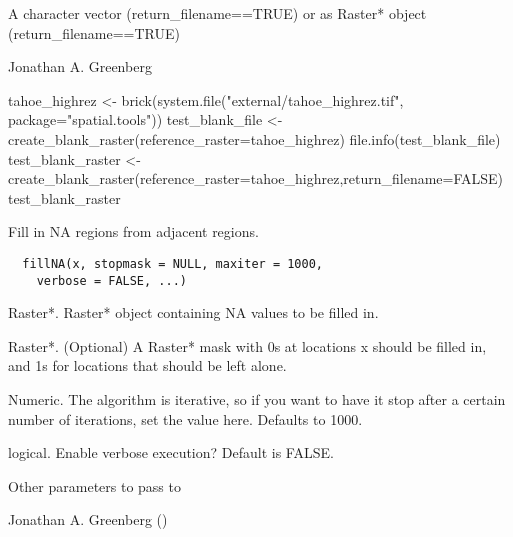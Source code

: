 \documentclass[a4paper]{book}
\begin{document}
%
\begin{Value}
A character vector (return\_filename==TRUE) or as Raster*
object (return\_filename==TRUE)
\end{Value}
%
\begin{Author}\relax
Jonathan A. Greenberg
\end{Author}
%
\begin{Examples}
\begin{ExampleCode}
tahoe_highrez <- brick(system.file("external/tahoe_highrez.tif", package="spatial.tools"))
test_blank_file <- create_blank_raster(reference_raster=tahoe_highrez)
file.info(test_blank_file)
test_blank_raster <- create_blank_raster(reference_raster=tahoe_highrez,return_filename=FALSE)
test_blank_raster
\end{ExampleCode}
\end{Examples}
%
\begin{Description}\relax
Fill in NA regions from adjacent regions.
\end{Description}
%
\begin{Usage}
\begin{verbatim}
  fillNA(x, stopmask = NULL, maxiter = 1000,
    verbose = FALSE, ...)
\end{verbatim}
\end{Usage}
%
\begin{Arguments}
\begin{ldescription}
\item[\code{x}] Raster*. Raster* object containing NA values to
be filled in.

\item[\code{stopmask}] Raster*. (Optional) A Raster* mask with
0s at locations x should be filled in, and 1s for
locations that should be left alone.

\item[\code{maxiter}] Numeric. The algorithm is iterative, so if
you want to have it stop after a certain number of
iterations, set the value here.  Defaults to 1000.

\item[\code{verbose}] logical. Enable verbose execution? Default
is FALSE.

\item[\code{...}] Other parameters to pass to
\end{ldescription}
\end{Arguments}
%
\begin{Author}\relax
Jonathan A. Greenberg
()
\end{Author}
\end{document}
